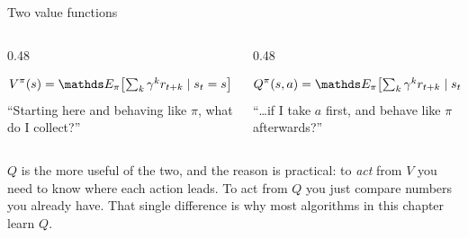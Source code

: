 \documentclass[aspectratio=169]{beamer}
\begin{document}
\begin{frame}{Two value functions}
  \begin{columns}[T]
    \begin{column}{0.48\textwidth}
      \begin{tcolorbox}[colback=armblue!8, colframe=armblue, boxrule=0.6pt, arc=2pt,
                        title={\textbf{State value} $V^\pi(s)$}]
        \small
        \[ V^\pi(s) = \E_\pi\!\left[\textstyle\sum_k \gamma^k r_{t+k} \mid s_t = s\right] \]
        \vskip 2pt
        ``Starting here and behaving like $\pi$, what do I collect?''
      \end{tcolorbox}
    \end{column}
    \begin{column}{0.48\textwidth}
      \begin{tcolorbox}[colback=paramgreen!8, colframe=paramgreen, boxrule=0.6pt, arc=2pt,
                        title={\textbf{Action value} $Q^\pi(s,a)$}]
        \small
        \[ Q^\pi(s,a) = \E_\pi\!\left[\textstyle\sum_k \gamma^k r_{t+k} \mid s_t = s, a_t = a\right] \]
        \vskip 2pt
        ``\dots if I take $a$ first, and behave like $\pi$ afterwards?''
      \end{tcolorbox}
    \end{column}
  \end{columns}

  \vskip 10pt
  \begin{tcolorbox}[colback=lightbg, colframe=popblue, boxrule=0.6pt, arc=2pt]
    \small
    $Q$ is the more useful of the two, and the reason is practical: to \emph{act} from $V$ you
    need to know where each action leads. To act from $Q$ you just compare numbers you already
    have. That single difference is why most algorithms in this chapter learn $Q$.
  \end{tcolorbox}
\end{frame}
\end{document}
